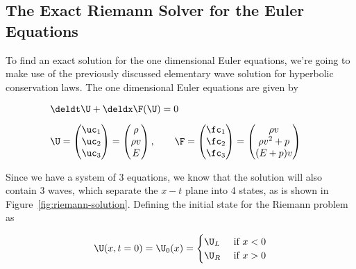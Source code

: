 \subsection{The Exact Riemann Solver for the Euler Equations}\label{chap:exact-riemann-solver}


To find an exact solution for the one dimensional Euler equations, we're going to make use of the
previously discussed elementary wave solution for hyperbolic conservation laws. The one dimensional
Euler equations are given by

\begin{align}
    & \deldt \U + \deldx\F(\U) = 0 && \\[.5em]
    & \U = \begin{pmatrix}
             \uc_1 \\ \uc_2 \\ \uc_3
           \end{pmatrix} =
         \begin{pmatrix}
           \rho \\ \rho v \\ E
         \end{pmatrix}, \quad \quad
    \F = \begin{pmatrix}
          \fc_1 \\ \fc_2 \\ \fc_3
         \end{pmatrix} =
         \begin{pmatrix}
           \rho v \\ \rho v^2 + p \\ (E + p) v
         \end{pmatrix} &&
\end{align}

Since we have a system of 3 equations, we know that the solution will also contain 3 waves, which
separate the $x-t$ plane into 4 states, as is shown in Figure~\ref{fig:riemann-solution}.
Defining the initial state for the Riemann problem as

\begin{align}
  \U(x, t=0) = \U_0(x) = \begin{cases}
                          \U_L & \text{ if } x < 0 \\
                          \U_R & \text{ if } x > 0
                         \end{cases}
\end{align}

